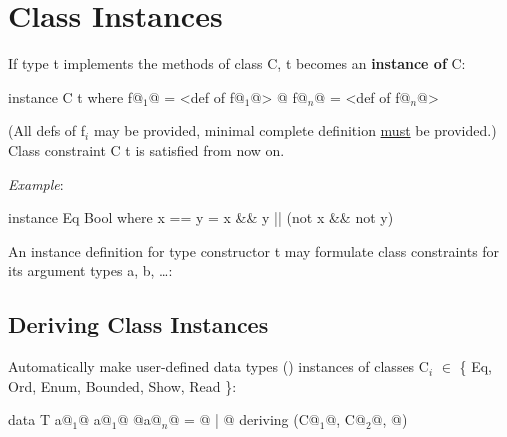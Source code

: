 \section{Class Instances}

If type t implements the methods of class C, t becomes an \textbf{instance of} C:
\begin{codebox}[haskell]
instance C t where
    f@$_1$@ = <def of f@$_1$@>
    @\dots@
    f@$_n$@ = <def of f@$_n$@>
\end{codebox}
(All defs of f$_i$ may be provided, minimal complete definition \underline{must} be provided.)
Class constraint C t is satisfied from now on.

\textit{Example}:

\begin{codebox}[haskell]
instance Eq Bool where
    x == y = x && y || (not x && not y)
\end{codebox}

An instance definition for type constructor t may formulate class constraints for its argument types a, b, \dots:\\




\subsection{Deriving Class Instances}

Automatically make user-defined data types () instances of classes C$_i$ $\in$ \{ Eq, Ord, Enum, Bounded, Show, Read \}:

\begin{codebox}[haskell]
data T a@$_1$@ a@$_1$@ @\dots@ a@$_n$@ = @\dots@
                   | @\dots@
    deriving (C@$_1$@, C@$_2$@, @\dots@)
\end{codebox}





